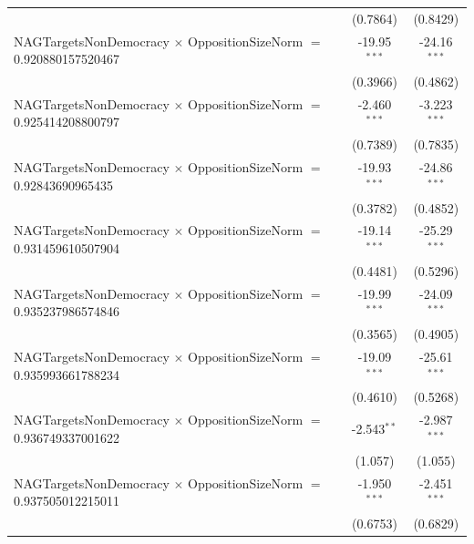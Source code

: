 \begin{tabular}{lcc}
                                                                                & (0.7864)             & (0.8429)\\   
   NAGTargetsNonDemocracy $\times$ OppositionSizeNorm $=$ 0.920880157520467     & -19.95$^{***}$       & -24.16$^{***}$\\   
                                                                                & (0.3966)             & (0.4862)\\   
   NAGTargetsNonDemocracy $\times$ OppositionSizeNorm $=$ 0.925414208800797     & -2.460$^{***}$       & -3.223$^{***}$\\   
                                                                                & (0.7389)             & (0.7835)\\   
   NAGTargetsNonDemocracy $\times$ OppositionSizeNorm $=$ 0.92843690965435      & -19.93$^{***}$       & -24.86$^{***}$\\   
                                                                                & (0.3782)             & (0.4852)\\   
   NAGTargetsNonDemocracy $\times$ OppositionSizeNorm $=$ 0.931459610507904     & -19.14$^{***}$       & -25.29$^{***}$\\   
                                                                                & (0.4481)             & (0.5296)\\   
   NAGTargetsNonDemocracy $\times$ OppositionSizeNorm $=$ 0.935237986574846     & -19.99$^{***}$       & -24.09$^{***}$\\   
                                                                                & (0.3565)             & (0.4905)\\   
   NAGTargetsNonDemocracy $\times$ OppositionSizeNorm $=$ 0.935993661788234     & -19.09$^{***}$       & -25.61$^{***}$\\   
                                                                                & (0.4610)             & (0.5268)\\   
   NAGTargetsNonDemocracy $\times$ OppositionSizeNorm $=$ 0.936749337001622     & -2.543$^{**}$        & -2.987$^{***}$\\   
                                                                                & (1.057)              & (1.055)\\   
   NAGTargetsNonDemocracy $\times$ OppositionSizeNorm $=$ 0.937505012215011     & -1.950$^{***}$       & -2.451$^{***}$\\   
                                                                                & (0.6753)             & (0.6829)\\   

\end{tabular}
